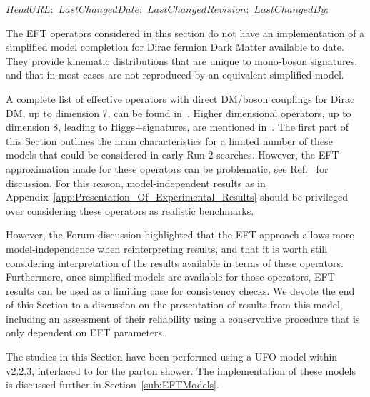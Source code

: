 \svnidlong
{$HeadURL: $}
{$LastChangedDate: $}
{$LastChangedRevision: $}
{$LastChangedBy: $}


The EFT operators considered in this section do not have an implementation 
of a simplified model completion for Dirac fermion Dark Matter available to date. 
They provide kinematic distributions that 
are unique to mono-boson signatures, and that in most cases 
are not reproduced by an equivalent simplified model.

A complete list of effective operators with direct DM/boson couplings for
Dirac DM, up to dimension 7, can be found in~\cite{Cotta:2012nj, Carpenter:2012rg, Crivellin:2015wva}. 
Higher dimensional operators, up to dimension 8, leading to Higgs+\MET signatures,
are mentioned in~\cite{Carpenter:2012rg, Berlin:2014cfa}. The first part of this Section outlines
the main characteristics for a limited number of these models that could be 
considered in early Run-2 searches. 
However, the EFT approximation made for these operators can be problematic, see Ref.~\cite{Berlin:2014cfa} for discussion.
For this reason, model-independent results as in Appendix~\ref{app:Presentation_Of_Experimental_Results} 
should be privileged over considering these operators as realistic benchmarks. 

However, the Forum discussion highlighted that the EFT approach allows
more model-independence when reinterpreting results, and that it is worth still considering
interpretation of the results available in terms of these operators. Furthermore, once simplified models are available
for those operators, EFT results can be used as a limiting case for consistency checks. 
We devote the end of this Section to a discussion on the presentation of results 
from this model, including an assessment of their reliability 
using a conservative procedure that is only dependent on EFT parameters.

The studies in this Section
have been performed using a UFO model within \madgraph v2.2.3, interfaced to  for the parton shower.  
The implementation of these models is discussed further in Section~\ref{sub:EFTModels}.

